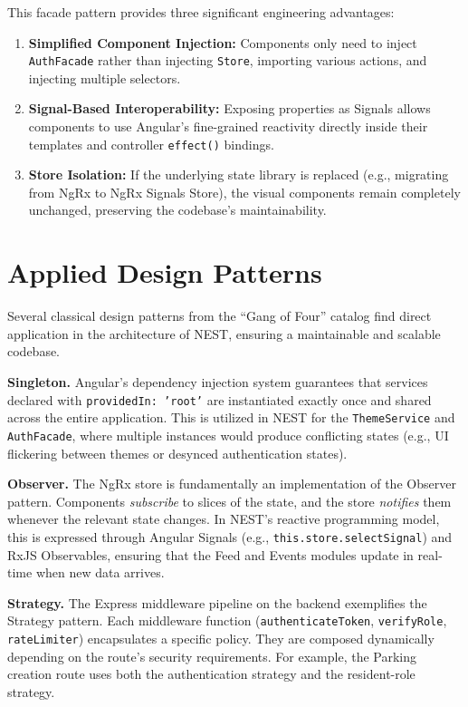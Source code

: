 This facade pattern provides three significant engineering advantages:
\begin{enumerate}
    \item \textbf{Simplified Component Injection:} Components only need to inject \texttt{AuthFacade} rather than injecting \texttt{Store}, importing various actions, and injecting multiple selectors.
    \item \textbf{Signal-Based Interoperability:} Exposing properties as Signals allows components to use Angular's fine-grained reactivity directly inside their templates and controller \texttt{effect()} bindings.
    \item \textbf{Store Isolation:} If the underlying state library is replaced (e.g., migrating from NgRx to NgRx Signals Store), the visual components remain completely unchanged, preserving the codebase's maintainability.
\end{enumerate}

\section{Applied Design Patterns}

Several classical design patterns from the ``Gang of Four'' catalog \cite{gamma1994design} find direct application in the architecture of NEST, ensuring a maintainable and scalable codebase.

\textbf{Singleton.} Angular's dependency injection system guarantees that services declared with \texttt{providedIn: 'root'} are instantiated exactly once and shared across the entire application. This is utilized in NEST for the \texttt{ThemeService} and \texttt{AuthFacade}, where multiple instances would produce conflicting states (e.g., UI flickering between themes or desynced authentication states).

\textbf{Observer.} The NgRx store is fundamentally an implementation of the Observer pattern. Components \textit{subscribe} to slices of the state, and the store \textit{notifies} them whenever the relevant state changes. In NEST's reactive programming model, this is expressed through Angular Signals (e.g., \texttt{this.store.selectSignal}) and RxJS Observables, ensuring that the Feed and Events modules update in real-time when new data arrives.

\textbf{Strategy.} The Express middleware pipeline on the backend exemplifies the Strategy pattern. Each middleware function (\texttt{authenticateToken}, \texttt{verifyRole}, \texttt{rateLimiter}) encapsulates a specific policy. They are composed dynamically depending on the route's security requirements. For example, the Parking creation route uses both the authentication strategy and the resident-role strategy.

